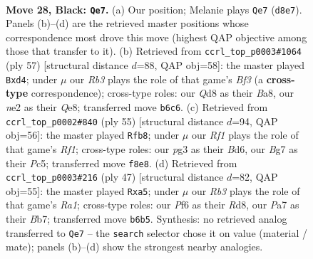\documentclass[11pt]{article}
\begin{document}
\clearpage

\begin{figure}[p]\centering
\begin{subfigure}{0.46\textwidth}\centering
\resizebox{\linewidth}{!}{%
\newchessgame
\chessboard[
  setfen={2bq1rk1/p5b1/Pr1pPp2/2pB4/2P3Q1/6P1/4N2K/R1B2R2 b - - 0 28},
  showmover=false,
  pgfstyle=straightmove, color=movearrow, markmove={d8-e7}
]}
\caption{}
\end{subfigure}\hfill
\begin{subfigure}{0.46\textwidth}\centering
\resizebox{\linewidth}{!}{%
\newchessgame
\chessboard[
  setfen={b3q1k1/2p1r1pp/p2pPb2/3P4/p1BB2Q1/7P/1P3P2/4R1K1 b - - 0 29},
  showmover=false,
  pgfstyle=straightmove, color=movearrow, markmove={f6-d4}
]}
\caption{}
\end{subfigure}
\\[4pt]
\begin{subfigure}{0.46\textwidth}\centering
\resizebox{\linewidth}{!}{%
\newchessgame
\chessboard[
  setfen={5rk1/3q1p2/p1bb1Bp1/2p3P1/1r2P2P/2N1QB2/1PP5/1K4R1 b - - 2 28},
  showmover=false,
  pgfstyle=straightmove, color=movearrow, markmove={f8-b8}
]}
\caption{}
\end{subfigure}\hfill
\begin{subfigure}{0.46\textwidth}\centering
\resizebox{\linewidth}{!}{%
\newchessgame
\chessboard[
  setfen={r2r2k1/1b1qpp2/3b2p1/R5Bp/1P5P/8/P2QBPP1/2R3K1 b - - 2 24},
  showmover=false,
  pgfstyle=straightmove, color=movearrow, markmove={a8-a5}
]}
\caption{}
\end{subfigure}
\caption{\textbf{Move 28, Black: \texttt{Qe7}.} (a) Our position; Melanie plays \texttt{Qe7} (\texttt{d8e7}). Panels (b)--(d) are the retrieved master positions whose correspondence most drove this move (highest QAP objective among those that transfer to it). (b) Retrieved from \texttt{ccrl\_top\_p0003\#1064} (ply 57) [structural distance $d$=88, QAP obj=58]: the master played \texttt{Bxd4}; under $\mu$ our \emph{Rb3} plays the role of that game's \emph{Bf3} (a \textbf{cross-type} correspondence); cross-type roles: our \emph{Q}d8 as their \emph{B}a8, our \emph{n}e2 as their \emph{Q}e8; transferred move \texttt{b6c6}. (c) Retrieved from \texttt{ccrl\_top\_p0002\#840} (ply 55) [structural distance $d$=94, QAP obj=56]: the master played \texttt{Rfb8}; under $\mu$ our \emph{Rf1} plays the role of that game's \emph{Rf1}; cross-type roles: our \emph{p}g3 as their \emph{B}d6, our \emph{B}g7 as their \emph{P}c5; transferred move \texttt{f8e8}. (d) Retrieved from \texttt{ccrl\_top\_p0003\#216} (ply 47) [structural distance $d$=82, QAP obj=55]: the master played \texttt{Rxa5}; under $\mu$ our \emph{Rb3} plays the role of that game's \emph{Ra1}; cross-type roles: our \emph{P}f6 as their \emph{R}d8, our \emph{P}a7 as their \emph{B}b7; transferred move \texttt{b6b5}. Synthesis: no retrieved analog transferred to \texttt{Qe7} -- the \texttt{search} selector chose it on value (material / mate); panels (b)--(d) show the strongest nearby analogies.}
\label{fig:thought-m55}
\end{figure}
\end{document}
